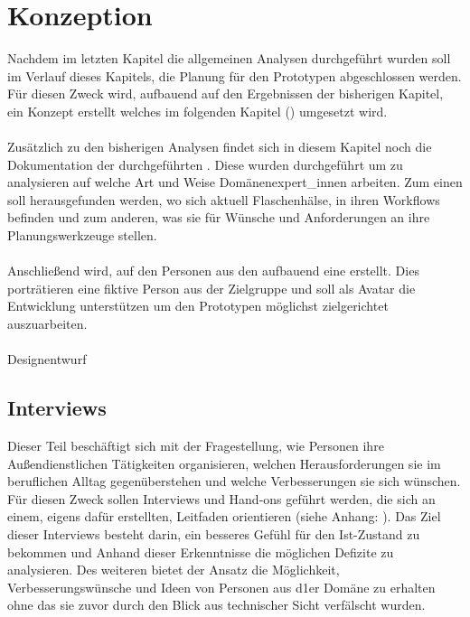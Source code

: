 \documentclass[Bachelorarbeit.tex]{subfiles}
\begin{document}
\chapter{Konzeption}
\label{chap:entwicklung}
Nachdem im letzten Kapitel die allgemeinen Analysen durchgeführt wurden soll im Verlauf dieses Kapitels, die Planung für den Prototypen abgeschlossen werden.
Für diesen Zweck wird, aufbauend auf den Ergebnissen der bisherigen Kapitel, ein Konzept erstellt welches im folgenden Kapitel () umgesetzt wird. \\
\\
Zusätzlich zu den bisherigen Analysen findet sich in diesem Kapitel noch die Dokumentation der durchgeführten .
Diese  wurden durchgeführt um zu analysieren auf welche Art und Weise  Domänenexpert\_innen arbeiten.
Zum einen soll herausgefunden werden, wo sich aktuell Flaschenhälse, in ihren Workflows befinden und zum anderen, was sie für Wünsche und Anforderungen an ihre Planungswerkzeuge stellen.\\
\\
Anschließend wird, auf den Personen aus den  aufbauend eine  erstellt.
Dies porträtieren eine fiktive Person aus der Zielgruppe und soll als Avatar die Entwicklung unterstützen um den Prototypen möglichst zielgerichtet auszuarbeiten.
\\
\\
Designentwurf

\section{Interviews}
\label{chap:analyse:sec:interviews}
Dieser Teil beschäftigt sich mit der Fragestellung, wie Personen ihre Außendienstlichen Tätigkeiten organisieren, welchen Herausforderungen sie im beruflichen Alltag gegenüberstehen und welche Verbesserungen sie sich wünschen. 
Für diesen Zweck sollen Interviews und Hand-ons  geführt werden, die sich an einem, eigens dafür erstellten, Leitfaden orientieren (siehe Anhang: ). 
Das Ziel dieser Interviews besteht darin, ein besseres Gefühl für den Ist-Zustand zu bekommen und Anhand dieser Erkenntnisse die möglichen Defizite zu analysieren.
Des weiteren bietet der Ansatz die Möglichkeit, Verbesserungswünsche und Ideen von Personen aus d1er Domäne zu erhalten ohne das sie zuvor durch den Blick aus technischer Sicht verfälscht wurden.
\end{document}
